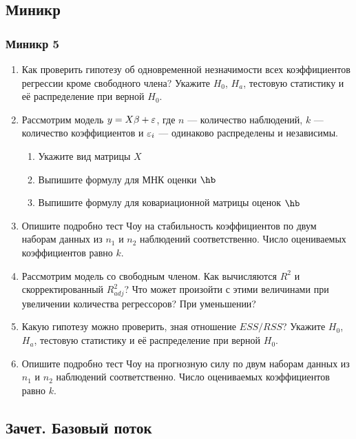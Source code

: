 \documentclass[12pt, a4paper]{article}
\theoremstyle{definition}
\begin{document}
\begin{enumerate}
\end{enumerate}

\subsection{Миникр}

\subsubsection*{Миникр 5}

\begin{enumerate}
\item Как проверить гипотезу об одновременной незначимости всех коэффициентов регрессии кроме свободного члена? Укажите $H_0$, $H_a$, тестовую статистику и её распределение при верной $H_0$.
\item Рассмотрим модель $y=X\beta + \varepsilon$, где $n$ — количество наблюдений, $k$ — количество коэффициентов и $\varepsilon_i$ — одинаково распределены и независимы.
\begin{enumerate}
\item Укажите вид матрицы $X$
\item Выпишите формулу для МНК оценки $\hb$
\item Выпишите формулу для ковариационной матрицы оценок $\hb$
\end{enumerate}
\item Опишите подробно тест Чоу на стабильность коэффициентов по двум наборам данных из $n_1$ и $n_2$ наблюдений соответственно. Число оцениваемых коэффициентов равно $k$.
\item Рассмотрим модель со свободным членом. Как вычисляются $R^2$ и скорректированный $R^2_{adj}$? Что может произойти с этими величинами при увеличении количества регрессоров? При уменьшении?
\item Какую гипотезу можно проверить, зная отношение $ESS/RSS$? Укажите $H_0$, $H_a$, тестовую статистику и её распределение при верной $H_0$.
\item Опишите подробно тест Чоу на прогнозную силу по двум наборам данных из $n_1$ и $n_2$ наблюдений соответственно. Число оцениваемых коэффициентов равно $k$.
\end{enumerate}


\subsection{Зачет. Базовый поток}
\end{document}
